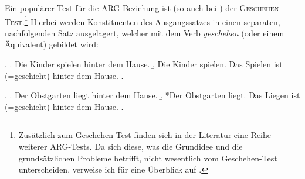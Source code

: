Ein populärer Test für die ARG-Beziehung ist (so auch bei \citealt[17f]{Jacobs:94}) der \textsc{Gesche\-hen-Test}.\footnote{Zusätzlich zum Geschehen-Test finden sich in der Literatur eine Reihe weiterer ARG-Tests. Da sich diese, was die Grundidee und die grundsätzlichen Probleme betrifft, nicht wesentlich vom Geschehen-Test unterscheiden, verweise ich für eine Überblick auf \citet[178]{Agel:00}.} Hierbei werden Konstituenten des Ausgangssatzes in einen separaten, nachfolgenden Satz ausgelagert, welcher mit dem Verb {\it geschehen} (oder einem Äquivalent) gebildet wird:

\ex. 
\a. Die Kinder spielen hinter dem Hause.
\b. Die Kinder spielen. Das Spielen ist (=geschieht) hinter dem Hause.
\z. \citep[63]{Storrer:92}

\ex. 
\a. Der Obstgarten liegt hinter dem Hause.
\b. *Der Obstgarten liegt. Das Liegen ist (=geschieht) hinter dem Hause.
\z. \citep[63]{Storrer:92}

